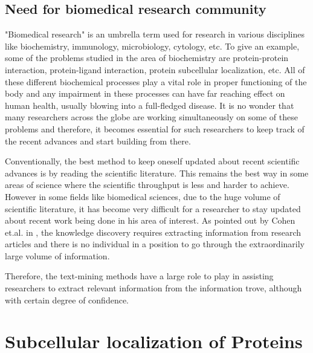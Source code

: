 \subsection*{Need for biomedical research community}

"Biomedical research" is an umbrella term used for research in various disciplines like biochemistry, immunology, microbiology, cytology, etc. To give an example, some of the problems studied in the area of biochemistry are protein-protein interaction, protein-ligand interaction, protein subcellular localization, etc. All of these different biochemical processes play a vital role in proper functioning of the body and any impairment in these processes can have far reaching effect on human health, usually blowing into a full-fledged disease. It is no wonder that many researchers across the globe are working simultaneously on some of these problems and therefore, it becomes essential for such researchers to keep track of the recent advances and start building from there. 

Conventionally, the best method to keep oneself updated about recent scientific advances is by reading the scientific literature. This remains the best way in some areas of science where the scientific throughput is less and harder to achieve. However in some fields like biomedical sciences, due to the huge volume of scientific literature, it has become very difficult for a researcher to stay updated about recent work being done in his area of interest. As pointed out by Cohen et.al. in \cite{cohen2005survey}, the knowledge discovery requires extracting information from research articles and there is no individual in a position to go through the extraordinarily large volume of information.

Therefore, the text-mining methods have a large role to play in assisting researchers to extract relevant information from the information trove, although with certain degree of confidence.

\section{Subcellular localization of Proteins}

